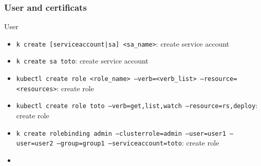 
\subsubsection{User and certificats}
\begin{frame}[fragile]{User}
  \begin{itemize}
    \item \texttt{k create [serviceaccount|sa] <sa\_name>}: create service account
    \item \texttt{k create sa toto}: create service account
    \item \texttt{kubectl create role <role_name> --verb=<verb_list> --resource=<resources>}: create role
    \item \texttt{kubectl create role toto --verb=get,list,watch --resource=rs,deploy}: create role
    \item \texttt{k create rolebinding admin --clusterrole=admin --user=user1 --user=user2 --group=group1 --serviceaccount=toto}: create role
    \item \texttt{}
  \end{itemize}
  \begin{lstlisting}
  \end{lstlisting}
\end{frame}
